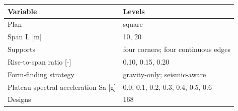 \small
\begin{tabular}{ll}
\toprule
Variable & Levels \\
\midrule
Plan & square \\
Span L [m] & 10, 20 \\
Supports & four corners; four continuous edges \\
Rise-to-span ratio [-] & 0.10, 0.15, 0.20 \\
Form-finding strategy & gravity-only; seismic-aware \\
Plateau spectral acceleration Sa [g] & 0.0, 0.1, 0.2, 0.3, 0.4, 0.5, 0.6 \\
Designs & 168 \\
\bottomrule
\end{tabular}
